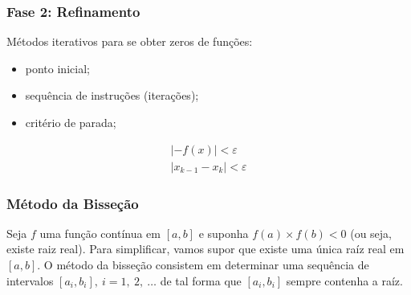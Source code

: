 \documentclass{article}
\begin{document}
        \subsubsection{Fase 2: Refinamento}
        Métodos iterativos para se obter zeros de funções:
        \begin{itemize}
            \item ponto inicial;
            \item sequência de instruções (iterações);
            \item critério de parada;
        \end{itemize}

        \begin{gather*}
            |-f(x)| < \varepsilon\\
            |x_{k-1} - x_k| < \varepsilon
        \end{gather*}

        \subsubsection{Método da Bisseção}
        Seja $f$ uma função contínua em $[a,b]$ e suponha $f(a) \times f(b) < 0$ (ou seja, existe raiz real). Para simplificar, vamos supor que existe uma única raíz real em $[a,b]$. O método da bisseção consistem em determinar uma sequência de intervalos $[a_i,b_i],~i = 1,~2,~\ldots$ de tal forma que $[a_i,b_i]$ sempre contenha a raíz.
\end{document}
